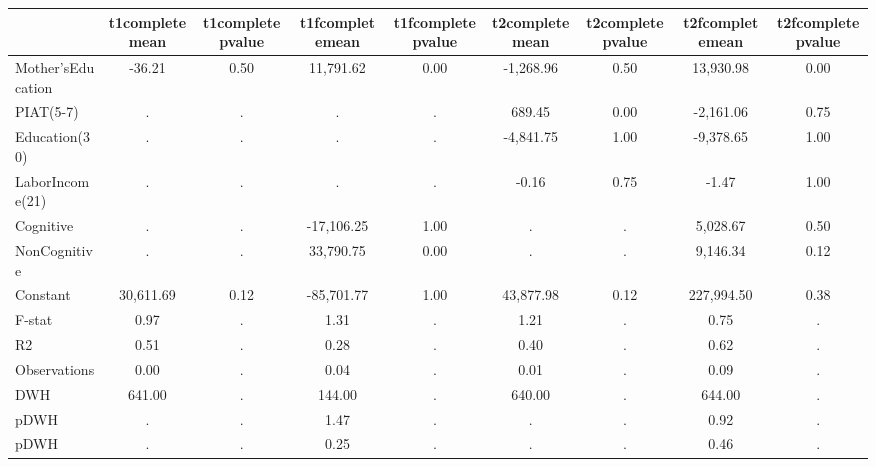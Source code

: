 \begin{table}[htbp]
\begin{tabular}{lcccccccc} \hline \hline
 & t1completemean  & t1completepvalue  & t1fcompletemean  & t1fcompletepvalue  & t2completemean  & t2completepvalue  & t2fcompletemean  & t2fcompletepvalue  \\  \hline 
Mother'sEducation &       -36.21 &         0.50 &    11,791.62 &         0.00 &    -1,268.96 &         0.50 &    13,930.98 &         0.00 \\  
PIAT(5-7) &            . &            . &            . &            . &       689.45 &         0.00 &    -2,161.06 &         0.75 \\  
Education(30) &            . &            . &            . &            . &    -4,841.75 &         1.00 &    -9,378.65 &         1.00 \\  
LaborIncome(21) &            . &            . &            . &            . &        -0.16 &         0.75 &        -1.47 &         1.00 \\  
Cognitive &            . &            . &   -17,106.25 &         1.00 &            . &            . &     5,028.67 &         0.50 \\  
NonCognitive &            . &            . &    33,790.75 &         0.00 &            . &            . &     9,146.34 &         0.12 \\  
Constant &    30,611.69 &         0.12 &   -85,701.77 &         1.00 &    43,877.98 &         0.12 &   227,994.50 &         0.38 \\  
F-stat &         0.97 &            . &         1.31 &            . &         1.21 &            . &         0.75 &            . \\  
R2 &         0.51 &            . &         0.28 &            . &         0.40 &            . &         0.62 &            . \\  
Observations &         0.00 &            . &         0.04 &            . &         0.01 &            . &         0.09 &            . \\  
DWH &       641.00 &            . &       144.00 &            . &       640.00 &            . &       644.00 &            . \\  
pDWH &            . &            . &         1.47 &            . &            . &            . &         0.92 &            . \\  
pDWH &            . &            . &         0.25 &            . &            . &            . &         0.46 &            . \\  
\hline \hline \end{tabular}
\end{table}
